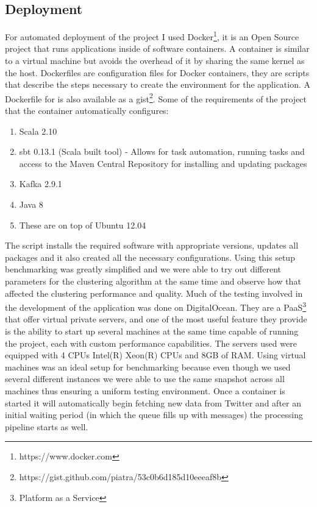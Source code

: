 \subsection{Deployment}
\label{deployment}
For automated deployment of the project I used Docker\footnote{https://www.docker.com}, it is an Open Source project that runs applications inside of software containers. A container is similar to a virtual machine but avoids the overhead of it by sharing the same kernel as the host. Dockerfiles are configuration files for Docker containers, they are scripts that describe the steps necessary to create the environment for the application. A Dockerfile for \project  is also available as a gist\footnote{https://gist.github.com/piatra/53c0b6d185d10eeeaf8b}. Some of the requirements of the project that the container automatically configures:
\begin{enumerate}
	\item Scala 2.10
	\item sbt 0.13.1 (Scala built tool) - Allows for task automation, running tasks and access to the Maven Central Repository for installing and updating packages 
	\item Kafka 2.9.1
	\item Java 8
	\item These are on top of Ubuntu 12.04
\end{enumerate}
The script installs the required software with appropriate versions, updates all packages and it also created all the necessary configurations. Using this setup benchmarking was greatly simplified and we were able to try out different parameters for the clustering algorithm at the same time and observe how that affected the clustering performance and quality.
Much of the testing involved in the development of the application was done on DigitalOcean. They are a PaaS\footnote{Platform as a Service} that offer virtual private servers, and one of the most useful feature they provide is the ability to start up several machines at the same time capable of running the project, each with custom performance capabilities. The servers used were equipped with 4 CPUs Intel(R) Xeon(R) CPUs and 8GB of RAM. Using virtual machines was an ideal setup for benchmarking because even though we used several different instances we were able to use the same snapshot across all machines thus ensuring a uniform testing environment. Once a container is started it will automatically begin fetching new data from Twitter and after an initial waiting period (in which the queue fills up with messages) the processing pipeline starts as well.
\newline

